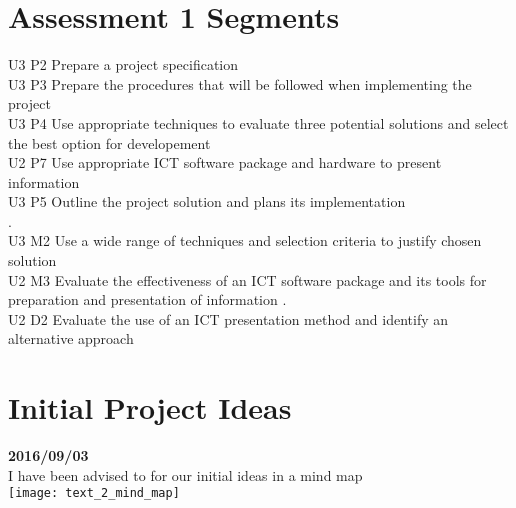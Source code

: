 \section{Assessment 1 Segments}
U3 P2 Prepare a project specification\\
U3 P3 Prepare the procedures that will be followed when implementing the project\\
U3 P4 Use appropriate techniques to evaluate three potential solutions and select the best option for developement\\
U2 P7 Use appropriate ICT software package and hardware to present information\\
U3 P5 Outline the project solution and plans its implementation\\
.\\
U3 M2 Use a wide range of techniques and selection criteria to justify chosen solution\\
U2 M3 Evaluate the effectiveness of an ICT software package and its tools for preparation and presentation of information
.\\
U2 D2 Evaluate the use of an ICT presentation method and identify an alternative approach


\section{Initial Project Ideas}\textbf{2016/09/03}\\
I have been advised to for our initial ideas in a mind map\\
\texttt{[image: text\_2\_mind\_map]}


